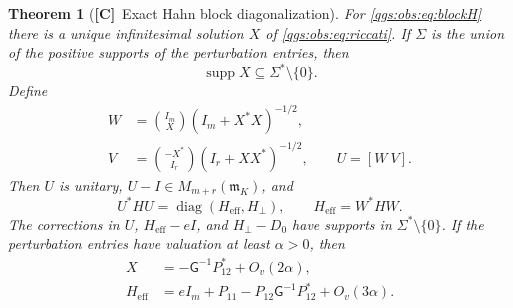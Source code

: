 \documentclass[11pt,oneside]{article}
\numberwithin{equation}{section}
\theoremstyle{plain}
\newtheorem{theorem}{Theorem}[section]
\theoremstyle{definition}
\theoremstyle{remark}
\newcommand{\mm}{\mathfrak m}
\newcommand{\Gap}{\mathsf G}
\newcommand{\Heff}{H_{\mathrm{eff}}}
\newcommand{\Oval}[1]{O_{v}(#1)}
\DeclareMathOperator{\diag}{diag}
\DeclareMathOperator{\supp}{supp}
\newcommand{\TC}{\textcolor{TierC}{\textsf{\bfseries[C]}}}
\begin{document}
\begin{theorem}[\TC\ Exact Hahn block diagonalization]\label{qgs:obs:thm:block}
For \eqref{qgs:obs:eq:blockH} there is a unique infinitesimal solution $X$ of \eqref{qgs:obs:eq:riccati}. If $\Sigma$ is the union of the positive supports of the perturbation entries, then
\begin{equation}\label{qgs:obs:eq:X-support}
 \supp X\subseteq\Sigma^*\setminus\{0\}.
\end{equation}
Define
\begin{align}
 W&=\binom{I_m}{X}(I_m+X^*X)^{-1/2},\label{qgs:obs:eq:J}\\
 V&=\binom{-X^*}{I_r}(I_r+XX^*)^{-1/2},\qquad
 U=[W\ V].\label{qgs:obs:eq:U}
\end{align}
Then $U$ is unitary, $U-I\in M_{m+r}(\mm_K)$, and
\begin{equation}\label{qgs:obs:eq:unitary-block}
 U^*HU=\diag(\Heff,H_\perp),\qquad \Heff=W^*HW.
\end{equation}
The corrections in $U$, $\Heff-eI$, and $H_\perp-D_0$ have supports in $\Sigma^*\setminus\{0\}$. If the perturbation entries have valuation at least $\alpha>0$, then
\begin{align}
 X&=-\Gap^{-1}P_{12}^*+\Oval{2\alpha},\label{qgs:obs:eq:X-leading}\\
 \Heff&=eI_m+P_{11}-P_{12}\Gap^{-1}P_{12}^*+\Oval{3\alpha}.
 \label{qgs:obs:eq:Heff-leading}
\end{align}
\end{theorem}
\end{document}

